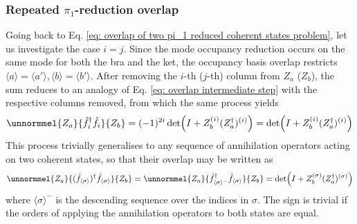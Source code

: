 \documentclass[12pt]{article}
\newcommand{\seq}[1]{\langle #1\rangle}
\newcommand{\hc}{^\dagger}
\begin{document}
	\subsubsection{Repeated $\pi_1$-reduction overlap} \label{sec:repeated pi_1 reduction overlap}
	Going back to Eq. \ref{eq: overlap of two pi_1 reduced coherent states problem}, let us investigate the case $i=j$. Since the mode occupancy reduction occurs on the same mode for both the bra and the ket, the occupancy basis overlap restricts $\seq{a}=\seq{a'}, \seq{b}=\seq{b'}$. After removing the $i$-th ($j$-th) column from $Z_a$ ($Z_b$), the sum reduces to an analogy of Eq. \ref{eq: overlap intermediate step} with the respective columns removed, from which the same process yields
	\begin{equation}
	\unnormmel{Z_a}{\hat{f}\hc_i\hat{f}_i}{Z_b}=(-1)^{2i}\det(I+Z_b^{(i)}(Z_a\hc)^{(i)})=\det(I+Z_b^{(i)}(Z_a\hc)^{(i)})
	\end{equation}
	This process trivially generalises to any sequence of annihilation operators acting on two coherent states, so that their overlap may be written as
	\begin{equation} \label{eq:repeated pi_1 reduction}
	\unnormmel{Z_a}{(\hat{f}_{\seq{\sigma}})\hc\hat{f}_{\seq{\sigma}}}{Z_b}=\unnormmel{Z_a}{\hat{f}\hc_{\seq{\sigma}^-}\hat{f}_{\seq{\sigma}}}{Z_b}=\det(I+Z_b^{(\sigma)}(Z_a\hc)^{(\sigma)})
	\end{equation}
	where $\seq{\sigma}^-$ is the descending sequence over the indices in $\sigma$. The sign is trivial if the orders of applying the annihilation operators to both states are equal.
	
\end{document}
